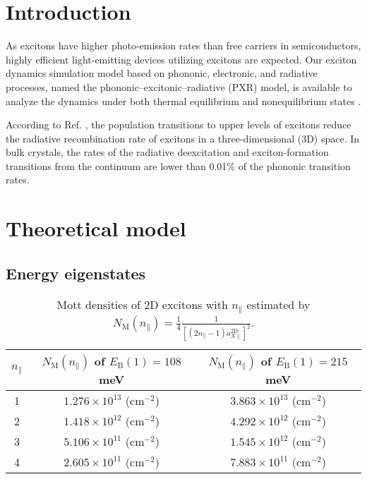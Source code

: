 \chapter{Introduction}
\label{chap:1}
%
As excitons have higher photo-emission rates than free carriers in semiconductors,
highly efficient light-emitting devices utilizing excitons are expected.
%
Our exciton dynamics simulation model based on phononic,
electronic, and radiative processes,
named the phononic--excitonic--radiative (PXR) model,
is available to analyze the dynamics under both thermal equilibrium and nonequilibrium states
\cite{CK-JL-2022, CK-MSSP-2022}%
.
%

%
According to Ref. \cite{CK-JL-2022},
the population transitions to upper levels of excitons reduce
the radiative recombination rate of excitons in a three-dimensional (3D) space.
%
In bulk crystals,
the rates of the radiative deexcitation and exciton-formation transitions
from the continuum are lower than 0.01\% of the phononic transition rates.
%





\chapter{Theoretical model}
\label{chap:2}
%

%
\section{Energy eigenstates}
%

%
\begin{table}
    \centering
    \caption{%
        Mott densities of 2D excitons with $n_{\parallel}$ estimated by
        $N_{\mathrm{M}}(n_{\parallel}) = \frac{1}{4} \frac{1}{ [ (2n_{\parallel} - 1) a_{X\parallel}^{\mathrm{2D}} ]^2}$.
    }
    \label{tab:1}
    \begin{tabular}[htbp]{@{}ccc@{}}
        \hline
        $n_{\parallel}$
        & $N_{\mathrm{M}}(n_{\parallel})$ of $E_{\mathrm{B}}(1) = 108$ meV
        & $N_{\mathrm{M}}(n_{\parallel})$ of $E_{\mathrm{B}}(1) = 215$ meV \\
        \hline
        1   & $1.276 \times 10^{13}$ (cm$^{-2}$)    & $3.863 \times 10^{13}$ (cm$^{-2}$) \\
        2	& $1.418 \times 10^{12}$ (cm$^{-2}$)    & $4.292 \times 10^{12}$ (cm$^{-2}$) \\
        3	& $5.106 \times 10^{11}$ (cm$^{-2}$)    & $1.545 \times 10^{12}$ (cm$^{-2}$) \\
        4	& $2.605 \times 10^{11}$ (cm$^{-2}$)    & $7.883 \times 10^{11}$ (cm$^{-2}$) \\
        \hline
    \end{tabular}
\end{table}
%

